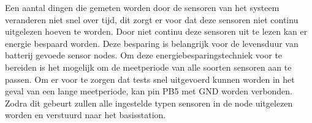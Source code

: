 Een aantal dingen die gemeten worden door de sensoren van het systeem veranderen niet snel over tijd, dit zorgt er voor dat deze sensoren niet continu uitgelezen hoeven te worden. Door niet continu deze sensoren uit te lezen kan er energie bespaard worden. Deze besparing is belangrijk voor de levensduur van batterij gevoede sensor nodes. Om deze energiebesparingstechniek voor te bereiden is het mogelijk om de meetperiode van alle soorten sensoren aan te passen. 
Om er voor te zorgen dat tests snel uitgevoerd kunnen worden in het geval van een lange meetperiode, kan pin PB5 met GND worden verbonden. Zodra dit gebeurt zullen alle ingestelde typen sensoren in de node uitgelezen worden en verstuurd naar het basisstation.